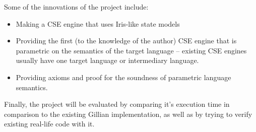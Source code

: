 Some of the innovations of the project include: \begin{itemize}
	\item Making a CSE engine that uses Iris-like state models
	\item Providing the first (to the knowledge of the author) CSE engine that is parametric on the semantics of the target language -- existing CSE engines usually have one target language or intermediary language.
	\item Providing axioms and proof for the soundness of parametric language semantics.
\end{itemize}

Finally, the project will be evaluated by comparing it's execution time in comparison to the existing Gillian implementation, as well as by trying to verify existing real-life code with it.
